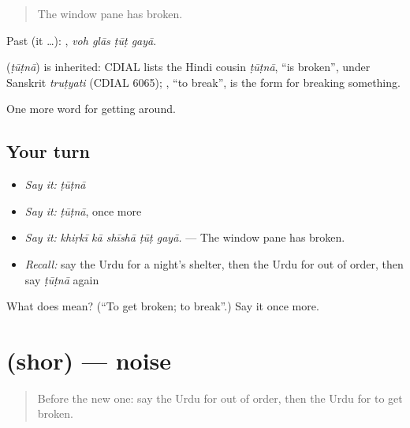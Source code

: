 \begin{quote}
The window pane has broken.
\end{quote}

Past (it …):    , \emph{voh glās ṭūṭ gayā}.

\begin{cousinweb}
\textbf{} (\emph{ṭūṭnā}) is inherited: CDIAL lists the Hindi cousin \emph{ṭūṭnā}, \textquotedblleft{}is broken\textquotedblright{}, under Sanskrit \emph{truṭyati} (CDIAL 6065); \textbf{}, \textquotedblleft{}to break\textquotedblright{}, is the form for breaking something.
\end{cousinweb}

\begin{grammarlens}[title={What you've built}]
One more word for getting around.
\end{grammarlens}

\subsection*{Your turn}
\begin{itemize}
\raggedright
  \item \emph{Say it:} \emph{ṭūṭnā}
  \item \emph{Say it:} \emph{ṭūṭnā}, once more
  \item \emph{Say it:} \emph{khiṛkī kā shīshā ṭūṭ gayā.} — The window pane has broken.
  \item \emph{Recall:} say the Urdu for a night's shelter, then the Urdu for out of order, then say \emph{ṭūṭnā} again
\end{itemize}

\begin{tcolorbox}[breakable,colback=teal!4,colframe=teal!35!black,title={Before you move on}]
What does  mean? (\textquotedblleft{}To get broken; to break\textquotedblright{}.) Say it once more.
\end{tcolorbox}
\section[\texorpdfstring{\ur{شور} (shor)}{شور (shor)}]{ (shor) — noise}

\label{lesson:UR-C407-shor}



\begin{quote}
Before the new one: say the Urdu for out of order, then the Urdu for to get broken.
\end{quote}

